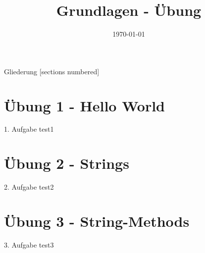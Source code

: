 



\title{Grundlagen - Übung}
\date{\today}




\maketitle

\begin{frame}{Gliederung}
	[sections numbered]
	\tableofcontents
\end{frame}


\section{Übung 1 - Hello World}

\begin{frame}{1. Aufgabe}
	test1
\end{frame}

\section{Übung 2 - Strings}

\begin{frame}{2. Aufgabe}
	test2
\end{frame}

\section{Übung 3 - String-Methods}

\begin{frame}{3. Aufgabe}
	test3
\end{frame}



